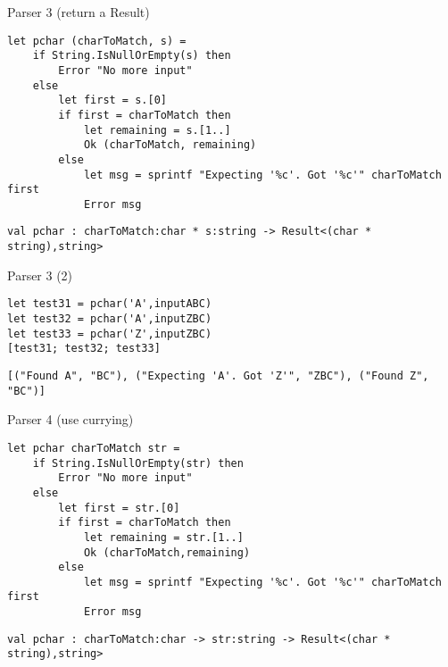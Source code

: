 \documentclass[t]{beamer}
\begin{document}
\begin{frame}[label={sec:orgb77c5c2},fragile]{Parser 3 (return a Result)}
 \begin{verbatim}
let pchar (charToMatch, s) = 
    if String.IsNullOrEmpty(s) then
        Error "No more input"
    else
        let first = s.[0] 
        if first = charToMatch then
            let remaining = s.[1..]
            Ok (charToMatch, remaining)
        else
            let msg = sprintf "Expecting '%c'. Got '%c'" charToMatch first
            Error msg
\end{verbatim}

\begin{verbatim}
val pchar : charToMatch:char * s:string -> Result<(char * string),string>
\end{verbatim}
\end{frame}


\begin{frame}[label={sec:orgef31d4c},fragile]{Parser 3 (2)}
 \begin{verbatim}
let test31 = pchar('A',inputABC) 
let test32 = pchar('A',inputZBC) 
let test33 = pchar('Z',inputZBC)
[test31; test32; test33]
\end{verbatim}

\begin{verbatim}
[("Found A", "BC"), ("Expecting 'A'. Got 'Z'", "ZBC"), ("Found Z", "BC")]
\end{verbatim}
\end{frame}

\begin{frame}[label={sec:org9aa0ca8},fragile]{Parser 4 (use currying)}
 \begin{verbatim}
let pchar charToMatch str = 
    if String.IsNullOrEmpty(str) then
        Error "No more input"
    else
        let first = str.[0] 
        if first = charToMatch then
            let remaining = str.[1..]
            Ok (charToMatch,remaining)
        else
            let msg = sprintf "Expecting '%c'. Got '%c'" charToMatch first
            Error msg
\end{verbatim}

\begin{verbatim}
val pchar : charToMatch:char -> str:string -> Result<(char * string),string>
\end{verbatim}
\end{frame}
\end{document}
